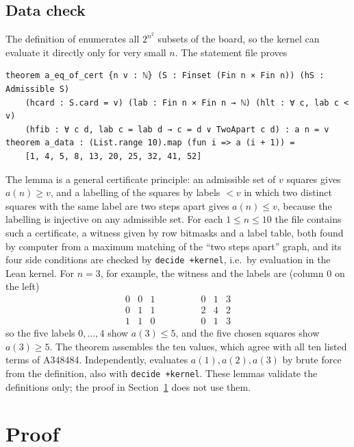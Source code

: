 \documentclass[11pt]{amsart}
\theoremstyle{plain}
\theoremstyle{definition}
\begin{document}
\subsection*{Data check}
The definition of  enumerates all $2^{n^2}$ subsets of the board, so the kernel can evaluate it directly only for very small $n$. The statement file proves
\begin{lstlisting}
theorem a_eq_of_cert {n v : ℕ} (S : Finset (Fin n × Fin n)) (hS : Admissible S)
    (hcard : S.card = v) (lab : Fin n × Fin n → ℕ) (hlt : ∀ c, lab c < v)
    (hfib : ∀ c d, lab c = lab d → c = d ∨ TwoApart c d) : a n = v
theorem a_data : (List.range 10).map (fun i => a (i + 1)) =
    [1, 4, 5, 8, 13, 20, 25, 32, 41, 52]
\end{lstlisting}
The lemma  is a general certificate principle: an admissible set of $v$ squares gives $a(n)\ge v$, and a labelling of the squares by labels $<v$ in which two distinct squares with the same label are two steps apart gives $a(n)\le v$, because the labelling is injective on any admissible set.
For each $1\le n\le10$ the file contains such a certificate, a witness given by row bitmasks and a label table, both found by computer from a maximum matching of the ``two steps apart'' graph, and its four side conditions are checked by \texttt{decide +kernel}, i.e.\ by evaluation in the Lean kernel.
For $n=3$, for example, the witness and the labels are (column $0$ on the left)
\[
  \begin{matrix} 0&0&1\\ 0&1&1\\ 1&1&0\end{matrix}
  \qquad\qquad
  \begin{matrix} 0&1&3\\ 2&4&2\\ 0&1&3\end{matrix}
\]
so the five labels $0,\dots,4$ show $a(3)\le5$, and the five chosen squares show $a(3)\ge5$.
The theorem  assembles the ten values, which agree with all ten listed terms of A348484.
Independently,  evaluates $a(1),a(2),a(3)$ by brute force from the definition, also with \texttt{decide +kernel}.
These lemmas validate the definitions only; the proof in Section~\ref{sec:proof} does not use them.

\section{Proof}\label{sec:proof}
\end{document}
